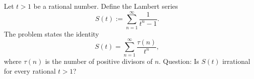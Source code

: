 Let $t>1$ be a rational number.
Define the Lambert series
\[
  S(t):=\sum_{n=1}^\infty \frac{1}{t^n-1}.
\]
The problem states the identity
\[
  S(t)=\sum_{n=1}^\infty \frac{\tau(n)}{t^n},
\]
where $\tau(n)$ is the number of positive divisors of $n$.
Question: Is $S(t)$ irrational for every rational $t>1$?
